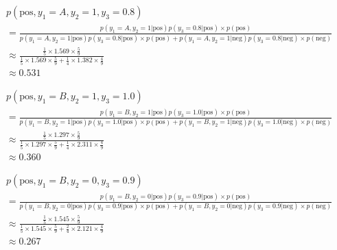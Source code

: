 \documentclass[12pt]{article}
\begin{document}
\begin{enumerate}[leftmargin=\labelsep,resume]
          $$
              \begin{aligned}
                   & p(\text{pos}, y_1=A, y_2=1, y_3=0.8)                                                     \\
                   & = \frac{p(y_1=A, y_2=1 | \text{pos}) p(y_3=0.8 | \text{pos}) \times p(\text{pos})}{
                      p(y_1=A, y_2=1 | \text{pos}) p(y_3=0.8 | \text{pos}) \times p(\text{pos}) +
                      p(y_1=A, y_2=1 | \text{neg}) p(y_3=0.8 | \text{neg}) \times p(\text{neg})
                  }                                                                                           \\
                   & \approx \frac
                  {\frac{1}{5} \times 1.569 \times \frac{5}{9}}
                  {\frac{1}{5} \times 1.569 \times \frac{5}{9} + \frac{1}{4} \times 1.382 \times \frac{4}{9}} \\
                   & \approx 0.531
              \end{aligned}
          $$

          $$
              \begin{aligned}
                   & p(\text{pos}, y_1=B, y_2=1, y_3=1.0)                                                     \\
                   & = \frac{p(y_1=B, y_2=1 | \text{pos}) p(y_3=1.0 | \text{pos}) \times p(\text{pos})}{
                      p(y_1=B, y_2=1 | \text{pos}) p(y_3=1.0 | \text{pos}) \times p(\text{pos}) +
                      p(y_1=B, y_2=1 | \text{neg}) p(y_3=1.0 | \text{neg}) \times p(\text{neg})
                  }                                                                                           \\
                   & \approx \frac
                  {\frac{1}{5} \times 1.297 \times \frac{5}{9}}
                  {\frac{1}{5} \times 1.297 \times \frac{5}{9} + \frac{1}{4} \times 2.311 \times \frac{4}{9}} \\
                   & \approx 0.360
              \end{aligned}
          $$

          $$
              \begin{aligned}
                   & p(\text{pos}, y_1=B, y_2=0, y_3=0.9)                                                     \\
                   & = \frac{p(y_1=B, y_2=0 | \text{pos}) p(y_3=0.9 | \text{pos}) \times p(\text{pos})}{
                      p(y_1=B, y_2=0 | \text{pos}) p(y_3=0.9 | \text{pos}) \times p(\text{pos}) +
                      p(y_1=B, y_2=0 | \text{neg}) p(y_3=0.9 | \text{neg}) \times p(\text{neg})
                  }                                                                                           \\
                   & \approx \frac
                  {\frac{1}{5} \times 1.545 \times \frac{5}{9}}
                  {\frac{1}{5} \times 1.545 \times \frac{5}{9} + \frac{2}{4} \times 2.121 \times \frac{4}{9}} \\
                   & \approx 0.267
              \end{aligned}
          $$


\end{enumerate}
\end{document}
